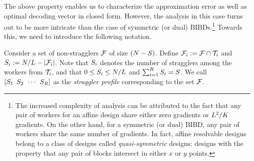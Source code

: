 \documentclass[conference,letterpaper]{IEEEtran}
\begin{document}


The above property enables us to characterize the approximation error as well as optimal decoding vector in closed form. However, the analysis in this case turns out to be more intricate than the case of symmetric (or dual) BIBDs.\footnote{The increased complexity of analysis can be attributed to the fact that any pair of workers for an affine design share either zero gradients or $L^2/K$ gradients. On the other hand, for a symmetric (or dual) BIBD, any pair of workers share the same number of gradients. In fact, affine resolvable designs belong to a class of designs called {\it quasi-symmetric} designs: designs with the property that any pair of blocks intersect in either $x$ or $y$ points.} Towards this, we need to introduce the following notation.

\begin{definition}
\label{def:straggler-profile}
Consider a set of non-stragglers $\mathcal{F}$ of size $(N - S)$. Define $\mathcal{F}_i := \mathcal{F}\cap\mathcal{T}_i$ %
and $S_i := N/L - |\mathcal{F}_i|$. Note that $S_i$ denotes the number of stragglers among the workers from $\mathcal{T}_i$, %
and that $0\leq S_i \leq N/L$ and $\sum_{i=1}^{R}S_i = S$.  We call $[S_1 \:\: S_2 \:\: \cdots \:\: S_{R}]$ as the {\it straggler profile} corresponding to the set $\mathcal{F}$. 
\end{definition}
\end{document}
